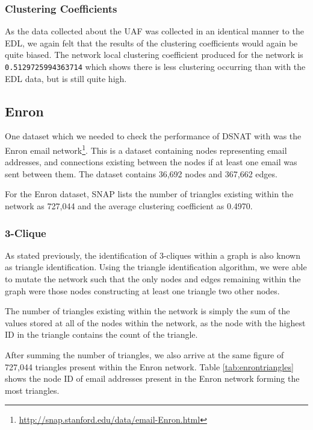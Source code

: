\subsubsection{Clustering Coefficients}
As the data collected about the UAF was collected in an identical manner to the EDL, we again felt that the results of the clustering coefficients would again be quite biased. The network local clustering coefficient produced for the network is \verb/0.5129725994363714/ which shows there is less clustering occurring than with the EDL data, but is still quite high.

\subsection{Enron}
One dataset which we needed to check the performance of DSNAT with was the Enron email network\footnote{\url{http://snap.stanford.edu/data/email-Enron.html}}. This is a dataset containing nodes representing email addresses, and connections existing between the nodes if at least one email was sent between them. The dataset contains 36,692 nodes and 367,662 edges.

For the Enron dataset, SNAP lists the number of triangles existing within the network as 727,044 and the average clustering coefficient as 0.4970. 

\subsubsection{3-Clique}
As stated previously, the identification of 3-cliques within a graph is also known as triangle identification. Using the triangle identification algorithm, we were able to mutate the network such that the only nodes and edges remaining within the graph were those nodes constructing at least one triangle two other nodes.

The number of triangles existing within the network is simply the sum of the values stored at all of the nodes within the network, as the node with the highest ID in the triangle contains the count of the triangle.

After summing the number of triangles, we also arrive at the same figure of 727,044 triangles present within the Enron network. Table \ref{tab:enrontriangles} shows the node ID of email addresses present in the Enron network forming the most triangles.

